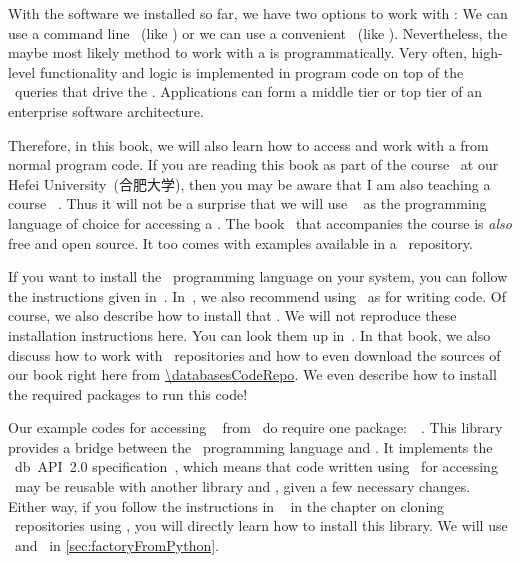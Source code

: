 %
\label{sec:pythonEtAl}%
%
With the software we installed so far, we have two options to work with :
We can use a command line ~(like \psql) or we can use a convenient ~(like \libreofficeBase).
Nevertheless, the maybe most likely method to work with a  is programmatically.
Very often, high-level functionality and logic is implemented in program code on top of the \sql\ queries that drive the .
Applications can form a middle tier or top tier of an enterprise software architecture.

Therefore, in this book, we will also learn how to access and work with a  from normal program code.
If you are reading this book as part of the  course~\cite{databases} at our Hefei University~(合肥大学), then you may be aware that I am also teaching a course ~\cite{programmingWithPython}.
Thus it will not be a surprise that we will use \python~\cite{H2023ABGTP3P,LH2015DSAAWP,programmingWithPython} as the programming language of choice for accessing a .
The book~\cite{programmingWithPython} that accompanies the  course is \emph{also} free and open source.
It too comes with examples available in a \github\ repository.

If you want to install the \python\ programming language on your system, you can follow the instructions given in~\cite{programmingWithPython}.
In~\cite{programmingWithPython}, we also recommend using \pycharm\ as  for writing code.
Of course, we also describe how to install that .
We will not reproduce these installation instructions here.
You can look them up in~\cite{programmingWithPython}.
In that book, we also discuss how to work with \git\ repositories and how to even download the sources of our book right here from \url{\databasesCodeRepo}.
We even describe how to install the required packages to run this code!%
%
\begin{sloppypar}%
Our example codes for accessing \postgresql\  from \python\ do require one package:~\psycopg~\cite{VDGE2010P}.
This library provides a bridge between the \python\ programming language and \postgresql.
It implements the \python~\acrshort{db}~\acrshort{API}~2.0 specification~\cite{PEP249}, which means that code written using \psycopg\ for accessing \postgresql\ may be reusable with another library and , given a few necessary changes.
Either way, if you follow the instructions in ~\cite{programmingWithPython} in the chapter on cloning \git~repositories using \pycharm, you will directly learn how to install this library.
We will use \python\ and \psycopg\ in \cref{sec:factoryFromPython}.%
\end{sloppypar}%
%
%
%
\endhsection%

